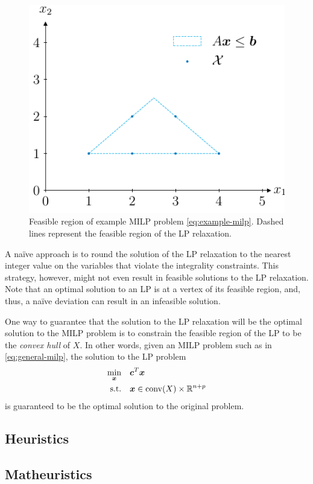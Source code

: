 \begin{figure}[h]
    \centering
    \includegraphics{pictures/milp_example_feasible_region.pdf}
    \caption{Feasible region of example MILP problem \eqref{eq:example-milp}. Dashed lines represent the feasible region of the LP relaxation.}
    \label{fig:milp-example}
\end{figure}

A naïve approach is to round the solution of the LP relaxation to the nearest integer value on the variables that violate the integrality constraints.
This strategy, however, might not even result in feasible solutions to the LP relaxation.
Note that an optimal solution to an LP is at a vertex of its feasible region, and, thus, a naïve deviation can result in an infeasible solution.

One way to guarantee that the solution to the LP relaxation will be the optimal solution to the MILP problem is to constrain the feasible region of the LP to be the \emph{convex hull} of $X$.
In other words, given an MILP problem such as in \eqref{eq:general-milp}, the solution to the LP problem
\begin{align*}
    \min_{\bm{x}} \quad & \bm{c}^{T}\bm{x} \\
    \textrm{s.t.} \quad & \bm{x}\in \mathrm{conv}(X) \times  \mathbb{R}^{n+p}
\end{align*}
is guaranteed to be the optimal solution to the original problem.



\subsection{Heuristics}

\subsection{Matheuristics}

